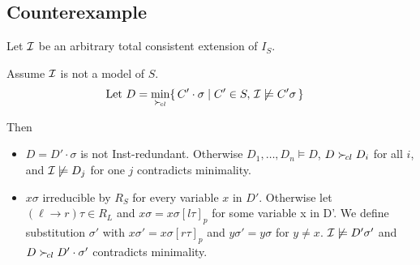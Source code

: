 \documentclass[%
handout,
]{beamer}
\begin{document}
\subsection{Counterexample}
\begin{frame}
    Let $\mathcal{I}$ be an arbitrary total consistent extension of $I_S$.
    \vspace{1.4em}

    Assume $\mathcal{I}$ is not a model of $S$.
    \begin{align*}
        \text{Let }
        D &= \min_{\mathrel\succ_{\!cl}}\{\,
        C'\cdot\sigma \mid C'\in S,\,
        \mathcal{I}\not\models C'\sigma\,
        \}
    \end{align*}

    Then 
    \begin{itemize}
        \item $D = D'\cdot\sigma$ is not Inst-redundant. Otherwise
        $D_1,\ldots,D_n\models D$, $D\mathrel\succ_{\!cl} D_i$ for all $i$,
        and $\mathcal{I}\not\models D_j$ for one $j$ contradicts minimality.
        \item $x\sigma$ irreducible by $R_S$ for every variable $x$ in $D'$.
        Otherwise let $(\ell\to r)\tau\in R_L$ and $x\sigma = x\sigma[l\tau]_p$ for some variable x in D'.
        We define substitution $\sigma'$ with $x\sigma' = x\sigma[r\tau]_p$ and $y\sigma' = y\sigma$ for $y\neq x$.
        $\mathcal{I}\not\models D'\sigma'$ and $D\mathrel\succ_{\!cl} D'\cdot\sigma'$ contradicts minimality.
    \end{itemize}

    
\end{frame}





        
\end{document}
